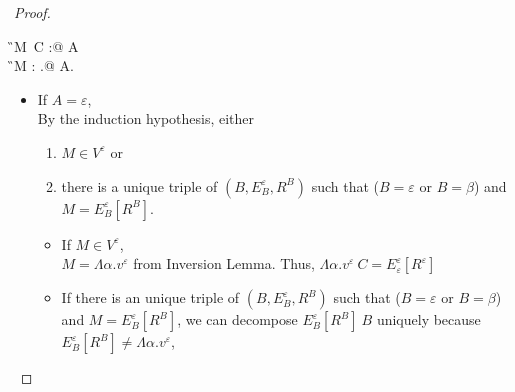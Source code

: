 \begin{proof}
{        \begin{rneqncase}{\TIns}{
                \G \V M\ C : @ A\\
                  \G \V M : \forall\alpha.\tau @ A.
            }

            \begin{itemize}
                \item If $ A = \varepsilon$,\\
                    By the induction hypothesis, either
                    \begin{enumerate}
                        \item $ M \in V^\varepsilon$ or
                        \item there is a unique triple of $(B, E^\varepsilon_B, R^B)$ such that ($B = \varepsilon$ or $B = \beta$) and $M = E^\varepsilon_B[R^B]$.
                    \end{enumerate}

                    \begin{itemize}
                        \item If $ M \in V^\varepsilon$,\\
                            $ M = \Lambda\alpha.v^\varepsilon$ from Inversion Lemma.
                            Thus, $ \Lambda\alpha.v^\varepsilon\ C = E^\varepsilon_\varepsilon [R^\varepsilon]$
                        \item If there is an unique triple of $(B, E^\varepsilon_B, R^B)$ such that ($B = \varepsilon$ or $B = \beta$) and $M = E^\varepsilon_B[R^B]$,
                            we can decompose $E^\varepsilon_B[R^B]\ B$ uniquely
                            because $ E^\varepsilon_B[R^B] \neq \Lambda\alpha.v^\varepsilon$,
                    \end{itemize}


\end{itemize}
\end{rneqncase}}
\end{proof}
